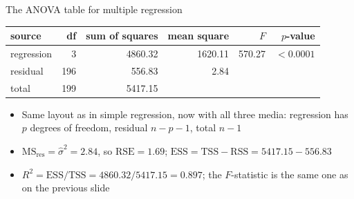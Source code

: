 \begin{frame}{The ANOVA table for multiple regression}
    \begin{center}
        \small
        \begin{tabular}{lrrrrr}
            \toprule
            source & df & sum of squares & mean square & $F$ & $p$-value \\
            \midrule
            regression & 3 & 4860.32 & 1620.11 & 570.27 & $<0.0001$ \\
            residual & 196 & 556.83 & 2.84 & & \\
            total & 199 & 5417.15 & & & \\
            \bottomrule
        \end{tabular}
    \end{center}
    \begin{itemize}
        \item Same layout as in simple regression, now with all three media: regression has $p$ degrees of freedom, residual $n-p-1$, total $n-1$
        \item $\mathrm{MS}_{\text{res}} = \hat\sigma^2 = 2.84$, so $\mathrm{RSE} = 1.69$; $\mathrm{ESS} = \mathrm{TSS} - \mathrm{RSS} = 5417.15 - 556.83$
        \item $R^2 = \mathrm{ESS}/\mathrm{TSS} = 4860.32/5417.15 = 0.897$; the $F$-statistic is the same one as on the previous slide
    \end{itemize}
\end{frame}


